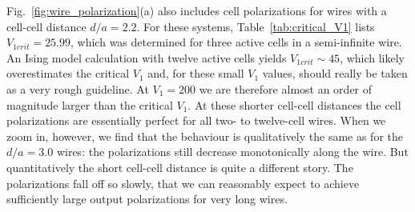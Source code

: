 Fig.~\ref{fig:wire_polarization}(a) also includes cell polarizations for wires
with a cell-cell distance $d/a = 2.2$. For these systems,
Table~\ref{tab:critical_V1} lists $V_{1crit} = 25.99$, which was determined for
three active cells in a semi-infinite wire. An Ising model calculation with twelve
active cells yields $V_{1crit} \sim 45$, which likely overestimates the critical
$V_1$ and, for these small $V_1$ values, should really be taken as a very rough
guideline. At $V_1 = 200$ we are therefore almost an
order of magnitude larger than the critical $V_1$. At these shorter cell-cell
distances the cell polarizations are essentially perfect for all two- to
twelve-cell wires. When we zoom in, however, we find that the behaviour is
qualitatively the same as for the $d/a = 3.0$ wires: the polarizations still
decrease monotonically along the wire. But quantitatively the short cell-cell
distance is quite a different story. The polarizations fall off so slowly,
that we can reasonably expect to achieve sufficiently large output polarizations
for very long wires.


